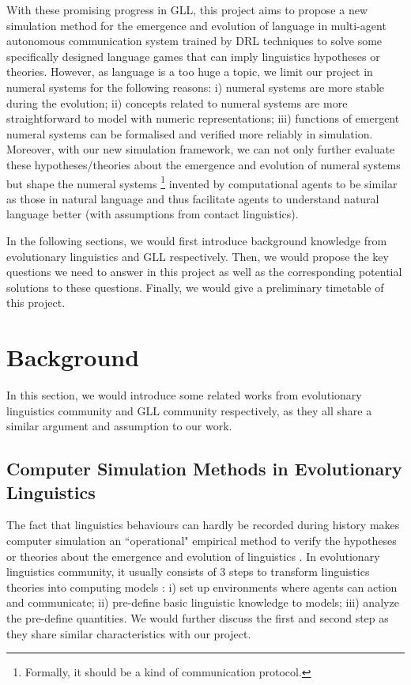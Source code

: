 \documentclass[a4paper,11pt]{article}
\begin{document}
With these promising progress in GLL, this project aims to propose a new simulation method for the emergence and evolution of language in multi-agent autonomous communication system trained by DRL techniques to solve some specifically designed language games that can imply linguistics hypotheses or theories. However, as language is a too huge a topic, we limit our project in numeral systems for the following reasons: i) numeral systems are more stable during the evolution; ii) concepts related to numeral systems are more straightforward to model with numeric representations; iii) functions of emergent numeral systems can be formalised and verified more reliably in simulation. Moreover, with our new simulation framework, we can not only further evaluate these hypotheses/theories about the emergence and evolution of numeral systems but shape the numeral systems \footnote{Formally, it should be a kind of communication protocol.} invented by computational agents to be similar as those in natural language and thus facilitate agents to understand natural language better (with assumptions from contact linguistics).

In the following sections, we would first introduce background knowledge from evolutionary linguistics and GLL respectively. Then, we would propose the key questions we need to answer in this project as well as the corresponding potential solutions to these questions. Finally, we would give a preliminary timetable of this project.


\section{Background}
\label{sec:2background}

In this section, we would introduce some related works from evolutionary linguistics community and GLL community respectively, as they all share a similar argument and assumption to our work.

\subsection{Computer Simulation Methods in Evolutionary Linguistics}
\label{ssec:2.1simulation_in_EL}

The fact that linguistics behaviours can hardly be recorded during history \cite{lieberman2006toward} makes computer simulation an ``operational" empirical method to verify the hypotheses or theories about the emergence and evolution of linguistics \cite{parisi2007emergence}. In evolutionary linguistics community, it usually consists of 3 steps to transform linguistics theories into computing models \cite{gong2013computer}: i) set up environments where agents can action and communicate; ii) pre-define basic linguistic knowledge to models; iii) analyze the pre-define quantities. We would further discuss the first and second step as they share similar characteristics with our project.
\end{document}
